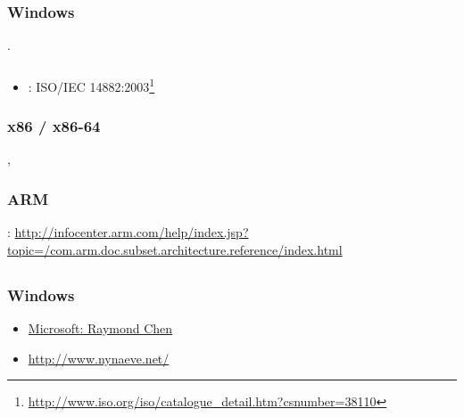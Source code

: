 ﻿\chapter{}

\section{}

\subsection{Windows}

\cite{Russinovich}.

\subsection{\CCpp}

\begin{itemize}
\item
{}: ISO/IEC 14882:2003\footnote{\url{http://www.iso.org/iso/catalogue_detail.htm?csnumber=38110}}
\end{itemize}

\subsection{x86 / x86-64}

\cite{Intel}, \cite{AMD}

\subsection{ARM}

: \url{http://infocenter.arm.com/help/index.jsp?topic=/com.arm.doc.subset.architecture.reference/index.html}

\section{}

\subsection{Windows}

\begin{itemize}
\item
\href{http://blogs.msdn.com/oldnewthing/}{Microsoft: Raymond Chen}
\item
\url{http://www.nynaeve.net/}
\end{itemize}

